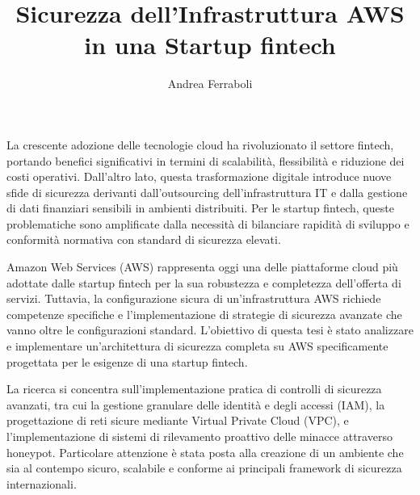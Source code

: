 \documentclass[a4paper,12pt]{report}
\begin{document}
\title{Sicurezza dell'Infrastruttura AWS in una Startup fintech}
\author{Andrea Ferraboli}

\maketitlepage
{}
La crescente adozione delle tecnologie cloud ha rivoluzionato il settore fintech, 
portando benefici significativi in termini di scalabilità, flessibilità e riduzione 
dei costi operativi. Dall'altro lato, questa trasformazione digitale introduce 
nuove sfide di sicurezza derivanti dall'outsourcing dell'infrastruttura IT e dalla 
gestione di dati finanziari sensibili in ambienti distribuiti. Per le startup fintech, 
queste problematiche sono amplificate dalla necessità di bilanciare rapidità di 
sviluppo e conformità normativa con standard di sicurezza elevati.

Amazon Web Services (AWS) rappresenta oggi una delle piattaforme cloud più 
adottate dalle startup fintech per la sua robustezza e completezza dell'offerta di 
servizi. Tuttavia, la configurazione sicura di un'infrastruttura AWS richiede competenze 
specifiche e l'implementazione di strategie di sicurezza avanzate che vanno oltre 
le configurazioni standard. L'obiettivo di questa tesi è stato analizzare e implementare 
un'architettura di sicurezza completa su AWS specificamente progettata per le 
esigenze di una startup fintech.

La ricerca si concentra sull'implementazione pratica di controlli di sicurezza 
avanzati, tra cui la gestione granulare delle identità e degli accessi (IAM), la 
progettazione di reti sicure mediante Virtual Private Cloud (VPC), e l'implementazione 
di sistemi di rilevamento proattivo delle minacce attraverso honeypot. Particolare 
attenzione è stata posta alla creazione di un ambiente che sia al contempo sicuro, 
scalabile e conforme ai principali framework di sicurezza internazionali.
\end{document}
